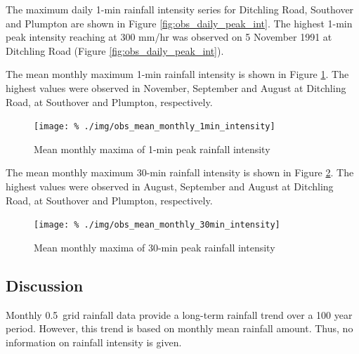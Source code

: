 The maximum daily 1-min rainfall intensity series for Ditchling Road, Southover
and Plumpton are shown in Figure \ref{fig:obs_daily_peak_int}. The highest 1-min
peak intensity reaching at 300 mm/hr was observed on 5 November 1991 at
Ditchling Road (Figure \ref{fig:obs_daily_peak_int}).

The mean monthly maximum 1-min rainfall intensity is shown in Figure
\ref{fig:obs_mean_monthly_1min_intensity}. The highest values were observed in
November, September and August at Ditchling Road, at Southover and Plumpton,
respectively.

\begin{figure}
  \centering
  \texttt{[image: \%
./img/obs\_mean\_monthly\_1min\_intensity]}
  \caption{Mean monthly maxima of 1-min peak rainfall intensity}
  \label{fig:obs_mean_monthly_1min_intensity}
\end{figure}

The mean monthly maximum 30-min rainfall intensity is shown in Figure
\ref{fig:obs_mean_monthly_30min_intensity}. The highest values were observed in
August, September and August at Ditchling Road, at Southover and Plumpton,
respectively.

\begin{figure}[htbp]
  \centering
  \texttt{[image: \%
./img/obs\_mean\_monthly\_30min\_intensity]}
  \caption{Mean monthly maxima of 30-min peak rainfall intensity}
  \label{fig:obs_mean_monthly_30min_intensity}
\end{figure}

\subsection{Discussion}
\label{sec:ObservedRainfallIntensityTrendsDiscussion}


Monthly 0.5\textdegree\ grid rainfall data provide a long-term rainfall trend
over a 100 year period. However, this trend is based on monthly mean rainfall
amount. Thus, no information on rainfall intensity is given.

